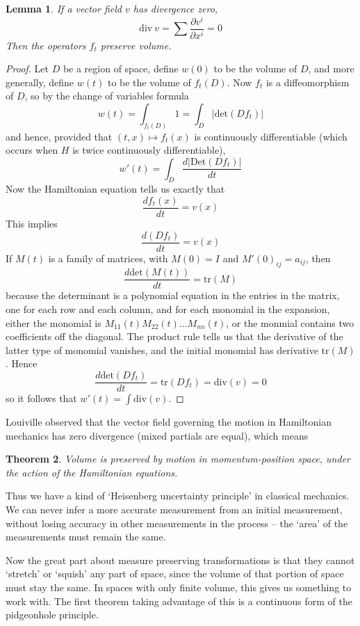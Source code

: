 \documentclass{article}
\theoremstyle{plain}
\newtheorem{theorem}{Theorem}
\newtheorem{lemma}[theorem]{Lemma}
\theoremstyle{definition}
\begin{document}
\begin{lemma}
    If a vector field $v$ has divergence zero,
    \[ \text{div}\ v = \sum \frac{\partial v^i}{\partial x^i} = 0 \]
    Then the operators $f_t$ preserve volume.
\end{lemma}
\begin{proof}
    Let $D$ be a region of space, define $w(0)$ to be the volume of $D$, and more generally, define $w(t)$ to be the volume of $f_t(D)$. Now $f_t$ is a diffeomorphism of $D$, so by the change of variables formula
    \[ w(t) = \int_{f_t(D)} 1 = \int_{D} |\text{det} (Df_t) | \]
    and hence, provided that $(t,x) \mapsto f_t(x)$ is continuously differentiable (which occurs when $H$ is twice continuously differentiable),
    \[ w'(t) = \int_D \frac{d |\text{Det}(Df_t)|}{dt} \]
    Now the Hamiltonian equation tells us exactly that
    \[ \frac{df_t(x)}{dt} = v(x) \]
    This implies
    \[ \frac{d(Df_t)}{dt} = v(x) \]
    If $M(t)$ is a family of matrices, with $M(0) = I$ and $M'(0)_{ij} = a_{ij}$, then
    \[ \frac{d \text{det}(M(t))}{dt} = \text{tr}(M) \]
    because the determinant is a polynomial equation in the entries in the matrix, one for each row and each column, and for each monomial in the expansion, either the monomial is $M_{11}(t) M_{22}(t) \dots M_{nn}(t)$, or the monmial contains two coefficients off the diagonal. The product rule tells us that the derivative of the latter type of monomial vanishes, and the initial monomial has derivative $\text{tr}(M)$. Hence
    \[ \frac{d \text{det}(Df_t)}{dt} = \text{tr}(Df_t) = \text{div}(v) = 0 \]
    so it follows that $w'(t) = \int \text{div}(v)$.
\end{proof}

Louiville observed that the vector field governing the motion in Hamiltonian mechanics has zero divergence (mixed partials are equal), which means

\begin{theorem}
    Volume is preserved by motion in momentum-position space, under the action of the Hamiltonian equations.
\end{theorem}

Thus we have a kind of `Heisenberg uncertainty principle' in classical mechanics. We can never infer a more accurate measurement from an initial measurement, without losing accuracy in other measurements in the process -- the `area' of the measurements must remain the same.

Now the great part about measure preserving transformations is that they cannot `stretch' or `squish' any part of space, since the volume of that portion of space must stay the same. In spaces with only finite volume, this gives us something to work with. The first theorem taking advantage of this is a continuous form of the pidgeonhole principle.
\end{document}
